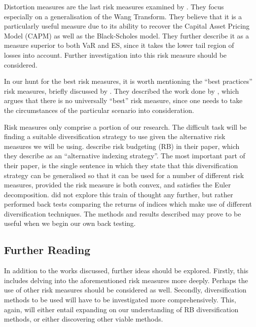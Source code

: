 \documentclass[12pt,a4paper]{article}
\begin{document}
Distortion measures are the last risk measures examined by \cite{dowd2006after}. They focus especially on a generalisation of the Wang Transform. They believe that it is a particularly useful measure due to its ability to recover the Capital Asset Pricing Model (CAPM) as well as the Black-Scholes model. They further describe it as a measure superior to both VaR and ES, since it takes the lower tail region of losses into account. Further investigation into this risk measure should be considered.

In our hunt for the best risk measures, it is worth mentioning the ``best practices'' risk measures, briefly discussed by \cite{dowd2006after}. They described the work done by \cite{dhaene2003economic}, which argues that there is no universally ``best'' risk measure, since one needs to take the circumstances of the particular scenario into consideration.

Risk measures only comprise a portion of our research. The difficult task will be finding a suitable diversification strategy to use given the alternative risk measures we will be using. \cite{bruder2012managing} describe risk budgeting (RB) in their paper, which they describe as an ``alternative indexing strategy''. The most important part of their paper, is the single sentence in which they state that this diversification strategy can be generalised so that it can be used for a number of different risk measures, provided the risk measure is both convex, and satisfies the Euler decomposition. \cite{bruder2012managing} did not explore this train of thought any further, but rather performed back tests comparing the returns of indices which make use of different diversification techniques. The methods and results described may prove to be useful when we begin our own back testing. 


\subsection{Further Reading}
\label{subsec:FurRead}

In addition to the works discussed, further ideas should be explored. Firstly, this includes delving into the aforementioned risk measures more deeply. Perhaps the use of other risk measures should be considered as well. Secondly, diversification methods to be used will have to be investigated more comprehensively. This, again, will either entail expanding on our understanding of RB diversification methods, or either discovering other viable methods. 
\end{document}
